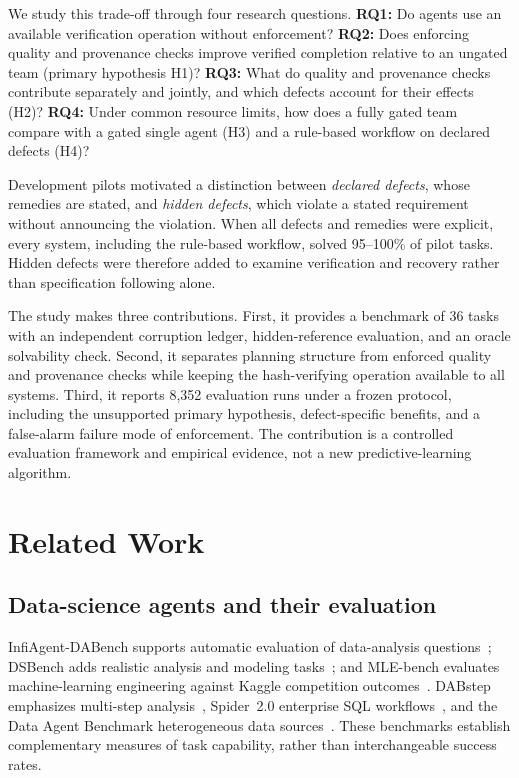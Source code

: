 \documentclass[conference]{IEEEtran}
\begin{document}
We study this trade-off through four research questions. \textbf{RQ1:} Do agents use an available verification operation without enforcement? \textbf{RQ2:} Does enforcing quality and provenance checks improve verified completion relative to an ungated team (primary hypothesis H1)? \textbf{RQ3:} What do quality and provenance checks contribute separately and jointly, and which defects account for their effects (H2)? \textbf{RQ4:} Under common resource limits, how does a fully gated team compare with a gated single agent (H3) and a rule-based workflow on declared defects (H4)?

Development pilots motivated a distinction between \emph{declared defects}, whose remedies are stated, and \emph{hidden defects}, which violate a stated requirement without announcing the violation. When all defects and remedies were explicit, every system, including the rule-based workflow, solved 95--100\% of pilot tasks. Hidden defects were therefore added to examine verification and recovery rather than specification following alone.

The study makes three contributions. First, it provides a benchmark of 36 tasks with an independent corruption ledger, hidden-reference evaluation, and an oracle solvability check. Second, it separates planning structure from enforced quality and provenance checks while keeping the hash-verifying operation available to all systems. Third, it reports 8,352 evaluation runs under a frozen protocol, including the unsupported primary hypothesis, defect-specific benefits, and a false-alarm failure mode of enforcement. The contribution is a controlled evaluation framework and empirical evidence, not a new predictive-learning algorithm.

\section{Related Work}
\label{sec:related}
\subsection{Data-science agents and their evaluation}
InfiAgent-DABench supports automatic evaluation of data-analysis questions~\cite{hu2024infiagent}; DSBench adds realistic analysis and modeling tasks~\cite{jing2025dsbench}; and MLE-bench evaluates machine-learning engineering against Kaggle competition outcomes~\cite{chan2025mlebench}. DABstep emphasizes multi-step analysis~\cite{egg2025dabstep}, Spider~2.0 enterprise SQL workflows~\cite{lei2025spider2}, and the Data Agent Benchmark heterogeneous data sources~\cite{ma2026dab}. These benchmarks establish complementary measures of task capability, rather than interchangeable success rates.
\end{document}
